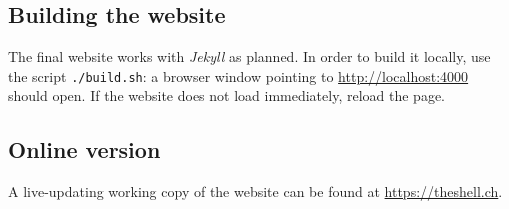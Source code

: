 \documentclass[hidelinks,12pt,a4paper,numbers=enddot]{scrartcl}
\begin{document}
\subsection{Building the website}
The final website works with \textit{Jekyll} as planned. In order to build it locally, use the script \texttt{./build.sh}:
a browser window pointing to \url{http://localhost:4000} should open. If the website does not load immediately, reload
the page.

\subsection{Online version}
A live-updating working copy of the website can be found at \url{https://theshell.ch}.
\end{document}
